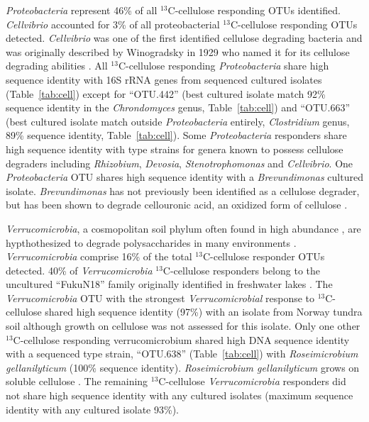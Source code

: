 \textit{Proteobacteria} represent 46\% of all $^{13}$C-cellulose responding
OTUs identified. \textit{Cellvibrio} accounted for 3\% of all proteobacterial
$^{13}$C-cellulose responding OTUs detected. \textit{Cellvibrio} was one of the
first identified cellulose degrading bacteria and was originally described by
Winogradsky in 1929 who named it for its cellulose degrading abilities
\citep{boone2001bergeys}. All $^{13}$C-cellulose responding
\textit{Proteobacteria} share high sequence identity with 16S rRNA genes from
sequenced cultured isolates (Table~\ref{tab:cell}) except for ``OTU.442'' (best
cultured isolate match 92\% sequence identity in the \textit{Chrondomyces}
genus, Table~\ref{tab:cell}) and ``OTU.663'' (best cultured isolate match
outside \textit{Proteobacteria} entirely, \textit{Clostridium} genus, 89\%
sequence identity, Table~\ref{tab:cell}). Some \textit{Proteobacteria}
responders share high sequence identity with type strains for genera known to
possess cellulose degraders including \textit{Rhizobium}, \textit{Devosia},
\textit{Stenotrophomonas} and \textit{Cellvibrio}. One \textit{Proteobacteria}
OTU shares high sequence identity with a \textit{Brevundimonas} cultured
isolate.  \textit{Brevundimonas} has not previously been identified as a
cellulose degrader, but has been shown to degrade cellouronic acid, an oxidized
form of cellulose \citep{Tavernier_2008}.

\textit{Verrucomicrobia}, a cosmopolitan soil phylum often found in high
abundance \citep{Fierer_2013}, are hypthothesized to degrade polysaccharides in
many environments \citep{Fierer_2013,Herlemann_2013,10543821}.
\textit{Verrucomicrobia} comprise 16\% of the total $^{13}$C-cellulose
responder OTUs detected. 40\% of \textit{Verrucomicrobia} $^{13}$C-cellulose
responders belong to the uncultured ``FukuN18'' family originally identified in
freshwater lakes \citep{Parveen_2013}.  The \textit{Verrucomicrobia} OTU with
the strongest \textit{Verrucomicrobial} response to $^{13}$C-cellulose shared
high sequence identity (97\%) with an isolate from Norway tundra soil
\citep{Jiang_2011} although growth on cellulose was not assessed for this
isolate. Only one other $^{13}$C-cellulose responding verrucomicrobium shared
high DNA sequence identity with a sequenced type strain, ``OTU.638''
(Table~\ref{tab:cell}) with \textit{Roseimicrobium gellanilyticum} (100\%
sequence identity).  \textit{Roseimicrobium gellanilyticum} grows on soluble
cellulose \citep{Otsuka_2012}. The remaining $^{13}$C-cellulose
\textit{Verrucomicrobia} responders did not share high sequence identity with
any cultured isolates (maximum sequence identity with any cultured isolate
93\%). 

